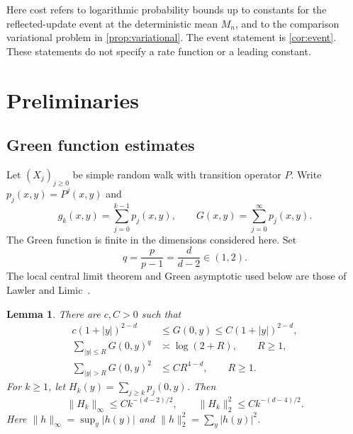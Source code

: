 \documentclass[11pt]{amsart}
\newtheorem{lemma}[theorem]{Lemma}
\theoremstyle{remark}
\begin{document}
Here cost refers to logarithmic probability bounds up to constants for
the reflected-update event at the deterministic mean $M_n$, and to the
comparison variational problem in \cref{prop:variational}. The event
statement is \cref{cor:event}. These statements do not specify a rate
function or a leading constant.

\section{Preliminaries}

\subsection{Green function estimates}
Let $(X_j)_{j\ge0}$ be simple random walk with transition operator $P$.
Write $p_j(x,y)=P^j(x,y)$ and
\[
 g_k(x,y)=\sum_{j=0}^{k-1}p_j(x,y),\qquad
 G(x,y)=\sum_{j=0}^\infty p_j(x,y).
\]
The Green function is finite in the dimensions considered here. Set
\[
 q=\frac{p}{p-1}=\frac d{d-2}\in(1,2).
\]
The local central limit theorem and Green asymptotic used below are those
of Lawler and Limic~\cite[Theorems~2.1.3 and~4.3.1]{LL}.

\begin{lemma}\label{lem:green}
There are $c,C>0$ such that
\begin{align}
 c(1+|y|)^{2-d}&\le G(0,y)\le C(1+|y|)^{2-d},\label{eq:green}\\
 \sum_{|y|\le R}G(0,y)^q&\asymp\log(2+R),\qquad R\ge1,\label{eq:logsum}\\
 \sum_{|y|>R}G(0,y)^2&\le CR^{4-d},\qquad R\ge1.\label{eq:squares}
\end{align}
For $k\ge1$, let $H_k(y)=\sum_{j\ge k}p_j(0,y)$. Then
\begin{equation}\label{eq:timegreen}
 \|H_k\|_\infty\le Ck^{-(d-2)/2},\qquad
 \|H_k\|_2^2\le Ck^{-(d-4)/2}.
\end{equation}
Here $\|h\|_\infty=\sup_y|h(y)|$ and $\|h\|_2^2=\sum_y|h(y)|^2$.
\end{lemma}
\end{document}
